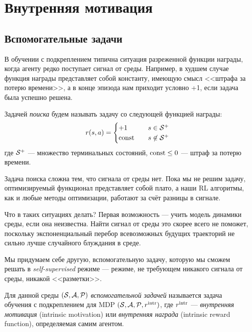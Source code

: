 \section{Внутренняя мотивация}\label{subsec:intrinsic_motivation}

\subsection{Вспомогательные задачи}

В обучении с подкреплением типична ситуация разреженной функции награды, когда агенту редко поступает сигнал от среды. Например, в худшем случае функция награды представляет собой константу, имеющую смысл <<штрафа за потерю времени>>, а в конце эпизода нам приходит условно +1, если задача была успешно решена.  

\begin{definition}
Задачей \emph{поиска} будем называть задачу со следующей функцией награды:
\begin{equation}\label{searchreward}
r(s, a) = \begin{cases}
+1 \quad & s \in \mathcal{S}^+ \\
\operatorname{const} \quad & s \not\in \mathcal{S}^+ \\
\end{cases}    
\end{equation}
где $\mathcal{S}^+$ --- множество терминальных состояний, $\operatorname{const} \le 0$ --- штраф за потерю времени.
\end{definition}

Задача поиска сложна тем, что сигнала от среды нет. Пока мы не решим задачу, оптимизируемый функционал представляет собой плато, а наши RL алгоритмы, как и любые методы оптимизации, работают за счёт разницы в сигнале.

Что в таких ситуациях делать? Первая возможность --- учить модель динамики среды, если она неизвестна. Найти сигнал от среды это скорее всего не поможет, поскольку экспоненциальный перебор всевозможных будущих траекторий не сильно лучше случайного блуждания в среде.

Мы придумаем себе другую, вспомогательную задачу, которую мы сможем решать в \emph{self-supervised} режиме --- режиме, не требующем никакого сигнала от среды, никакой <<разметки>>.

\begin{definition}
Для данной среды $(\mathcal{S}, \mathcal{A}, \mathcal{P})$ \emph{вспомогательной задачей} называется задача обучения с подкреплением для MDP $(\mathcal{S}, \mathcal{A}, \mathcal{P}, r^{\mathrm{intr}})$, где $r^{\mathrm{intr}}$ --- \emph{внутренняя мотивация} (intrinsic motivation) или \emph{внутренняя награда} (intrinsic reward function), определяемая самим агентом.
\end{definition}


